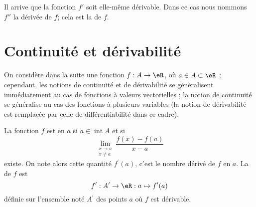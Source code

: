 Il arrive que la fonction $f'$ soit elle-même dérivable. Dans ce cas nous nommons $f''$ la dérivée de $f$; cela est la  de $f$.

\section{Continuité et dérivabilité}
\label{seccontetderiv}

On considère dans la suite une fonction $f : A \to \eR$, où $a \in A \subset \eR$ ; cependant, les notions de continuité et de dérivabilité se généralisent immédiatement au cas de fonctions à valeurs vectorielles ; la notion de continuité se généralise au cas des fonctions à plusieurs variables (la notion de dérivabilité est remplacée par celle de différentiabilité dans ce cadre).

\begin{definition}
    La fonction $f$ est  en \( a\) si $a \in
  \operatorname{int} A$ et si
  \begin{equation*}
    \lim_{\substack{x\rightarrow a\\x\neq a}} \frac{f(x)-f(a)}{x-a}
  \end{equation*}
  existe. On note alors cette quantité $f^\prime(a)$, c'est le nombre
  dérivé de $f$ en $a$. La  de $f$ est
  \begin{equation*}
    f^\prime : A^\prime \to \eR : a \mapsto f^\prime(a)
  \end{equation*}
  définie sur l'ensemble noté $A^\prime$ des points $a$ où $f$ est
  dérivable.
\end{definition}

